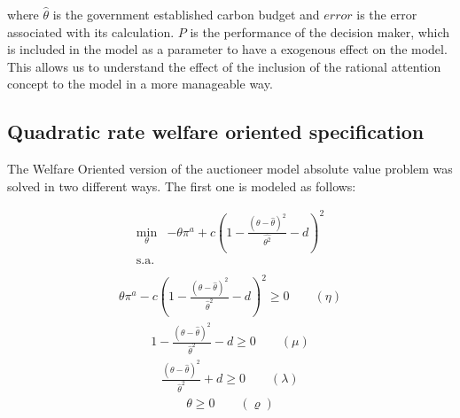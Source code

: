 \documentclass[a4paper,fleqn]{cas-dc}
\begin{document}
where $\hat{\theta}$ is the government established carbon budget and $error$ is the error associated with its calculation. $P$ is the performance of the decision maker, which is included in the model as a parameter to have a exogenous effect on the model. This allows us to understand the effect of the inclusion of the rational attention concept to the model in a more manageable way.

\subsection{Quadratic rate welfare oriented specification}\label{subsec:QR}

The Welfare Oriented version of the auctioneer model absolute value problem was solved in two different ways. The first one is modeled as follows:

\begin{equation}
\begin{array}{rrclcl}
\displaystyle \min_{\theta} & -\theta \pi^a + c(1-\frac{(\theta - \hat{\theta})^2}{\hat{\theta^2}}-d)^2 \\\textrm{s.a.} \label{fo:social1}\\
\end{array}
\end{equation}
\begin{equation}
\begin{array}{rrclcl}
\displaystyle \theta \pi^a - c(1-\frac{(\theta - \hat{\theta})^2}{\hat{\theta}^2}-d)^2 \geq 0 \qquad (\eta)\label{social1:r11}
\end{array}
\end{equation}
\begin{equation}
\begin{array}{rrclcl}
1 - \frac{(\theta-\hat{\theta})^2}{\hat{\theta}^2} - d \geq 0 \qquad (\mu) \label{social1:r31}
\end{array}
\end{equation}
\begin{equation}
\begin{array}{rrclcl}
\frac{(\theta-\hat{\theta})^2}{\hat{\theta}^2 }+ d \geq 0 \qquad (\lambda)\label{social1:r41}
\end{array}
\end{equation}
\begin{equation}
\begin{array}{rrclcl}
\theta \geq 0 \qquad (\varrho)\label{social1:r21}
\end{array}
\end{equation}
\end{document}
